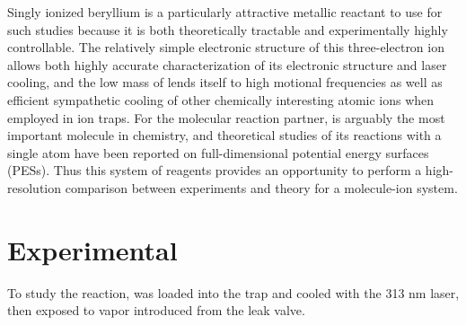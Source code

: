 Singly ionized beryllium is a particularly attractive metallic reactant to use for such studies because it is both theoretically tractable and experimentally highly controllable. The relatively simple electronic structure of this three-electron ion allows both highly accurate characterization of its electronic structure and laser cooling,\cite{Bollinger1985} and the low mass of  lends itself to high motional frequencies as well as efficient sympathetic cooling of other chemically interesting atomic ions when employed in ion traps.\cite{Chen2014a,Roth2006,Larson1986,Schowalter2016} For the molecular reaction partner,  is arguably the most important molecule in chemistry, and theoretical studies of its reactions with a single atom have been reported on full-dimensional potential energy surfaces (PESs).\cite{Li2013,Song2015,Ray2017,Li2015,Xiao2011} Thus this system of reagents provides an opportunity to perform a high-resolution comparison between experiments and theory for a molecule-ion system.

\section{Experimental}

To study the  reaction,  was loaded into the trap and cooled with the 313 nm laser, then exposed to  vapor introduced from the leak valve.

